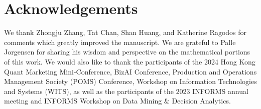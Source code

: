 \documentclass[12pt]{article}  %
\begin{document}
\section*{Acknowledgements}
We thank Zhongju Zhang, Tat Chan, Shan Huang, and Katherine Ragodos for comments which greatly improved the manuscript. We are grateful to Palle Jorgensen for sharing his wisdom and perspective on the mathematical portions of this work. We would also like to thank the participants of the 2024 Hong Kong Quant Marketing Mini-Conference, BizAI Conference, Production and Operations Management Society (POMS) Conference, Workshop on Information Technologies and Systems (WITS), as well as the participants of the 2023 INFORMS annual meeting and INFORMS Workshop on Data Mining \& Decision Analytics.









\newpage
\end{document}
